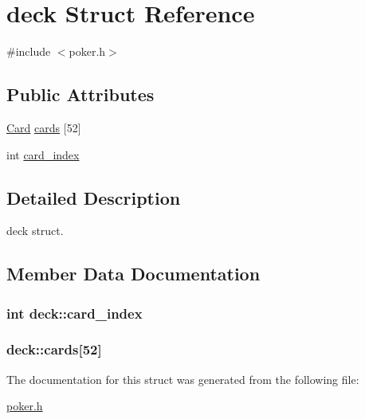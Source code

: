 \hypertarget{structdeck}{\section{deck Struct Reference}
\label{structdeck}
}


{\ttfamily \#include $<$poker.\+h$>$}

\subsection*{Public Attributes}
\begin{DoxyCompactItemize}
\item 
\hyperlink{poker_8h_aacb186b77382a02f7317dc38797f37c2}{Card} \hyperlink{structdeck_a690220744a0e3deb4aa19071affbba1c}{cards} \mbox{[}52\mbox{]}
\item 
int \hyperlink{structdeck_ae54744d27adeb53f8120417e6b295510}{card\+\_\+index}
\end{DoxyCompactItemize}


\subsection{Detailed Description}
deck struct. 

\subsection{Member Data Documentation}
\hypertarget{structdeck_ae54744d27adeb53f8120417e6b295510}{
\subsubsection[{card\+\_\+index}]{\setlength{\rightskip}{0pt plus 5cm}int deck\+::card\+\_\+index}}\label{structdeck_ae54744d27adeb53f8120417e6b295510}
\hypertarget{structdeck_a690220744a0e3deb4aa19071affbba1c}{
\subsubsection[{cards}]{ deck\+::cards\mbox{[}52\mbox{]}}}\label{structdeck_a690220744a0e3deb4aa19071affbba1c}


The documentation for this struct was generated from the following file\+:\begin{DoxyCompactItemize}
\item 
\hyperlink{poker_8h}{poker.\+h}\end{DoxyCompactItemize}
